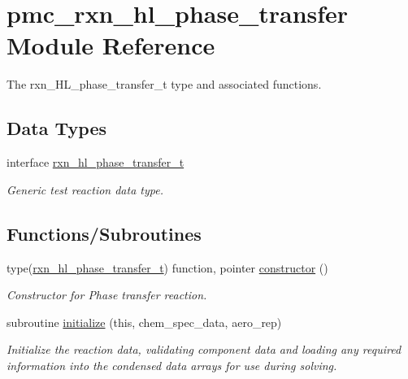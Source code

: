\hypertarget{namespacepmc__rxn__hl__phase__transfer}{}\section{pmc\+\_\+rxn\+\_\+hl\+\_\+phase\+\_\+transfer Module Reference}
\label{namespacepmc__rxn__hl__phase__transfer}


The rxn\+\_\+\+H\+L\+\_\+phase\+\_\+transfer\+\_\+t type and associated functions.  


\subsection*{Data Types}
\begin{DoxyCompactItemize}
\item 
interface \mbox{\hyperlink{structpmc__rxn__hl__phase__transfer_1_1rxn__hl__phase__transfer__t}{rxn\+\_\+hl\+\_\+phase\+\_\+transfer\+\_\+t}}
\begin{DoxyCompactList}\small\item\em Generic test reaction data type. \end{DoxyCompactList}\end{DoxyCompactItemize}
\subsection*{Functions/\+Subroutines}
\begin{DoxyCompactItemize}
\item 
type(\mbox{\hyperlink{structpmc__rxn__hl__phase__transfer_1_1rxn__hl__phase__transfer__t}{rxn\+\_\+hl\+\_\+phase\+\_\+transfer\+\_\+t}}) function, pointer \mbox{\hyperlink{namespacepmc__rxn__hl__phase__transfer_a1d307b730caaec01f18e464b315042a1}{constructor}} ()
\begin{DoxyCompactList}\small\item\em Constructor for Phase transfer reaction. \end{DoxyCompactList}\item 
subroutine \mbox{\hyperlink{namespacepmc__rxn__hl__phase__transfer_a0a981521812601400c9e9d40e803e40e}{initialize}} (this, chem\+\_\+spec\+\_\+data, aero\+\_\+rep)
\begin{DoxyCompactList}\small\item\em Initialize the reaction data, validating component data and loading any required information into the condensed data arrays for use during solving. \end{DoxyCompactList}\end{DoxyCompactItemize}


